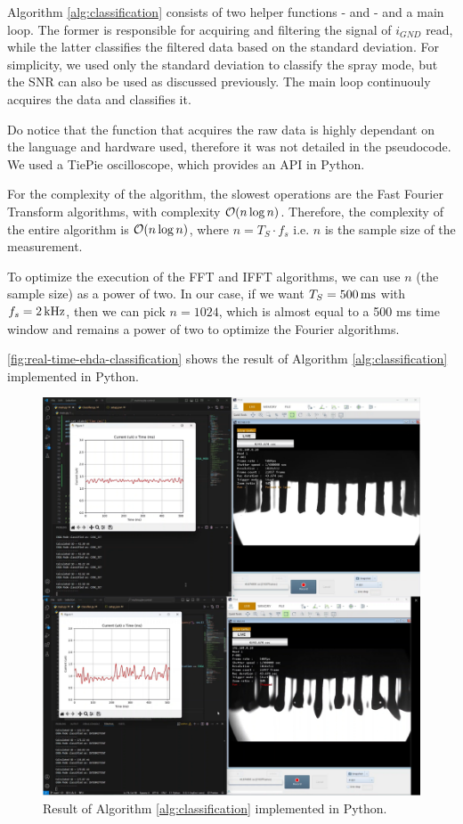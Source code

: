 \documentclass[oneside,12pt]{article}
\begin{document}
Algorithm \ref{alg:classification} consists of two helper functions - 
and  - and a main loop. 
The former is responsible for acquiring and filtering the signal of $i_{GND}$ read,
while the latter classifies the filtered data based on the standard deviation.
For simplicity, we used only the standard deviation to classify the spray mode, 
but the SNR can also be used as discussed previously. 
The main loop continuouly acquires the data and classifies it.

Do notice that the function that acquires the raw data is highly dependant on the language and hardware 
used, therefore it was not detailed in the pseudocode. We used a TiePie oscilloscope, which
provides an API in Python.

For the complexity of the algorithm, the slowest operations are the Fast Fourier
Transform algorithms, with complexity $\mathcal{O} (n\log{}n)$. Therefore, the complexity 
of the entire algorithm is $\mathcal{O} (n\log{}n)$, where $n = T_S \cdot f_s$ i.e. $n$ is the 
sample size of the measurement.

To optimize the execution of the FFT and IFFT algorithms, we can use $n$ (the sample size) as a power of two.
In our case, if we want $T_S = 500 \,\mathrm{ms}$ with $f_s = 2 \,\mathrm{kHz}$, then we can pick $n = 1024$, which is almost equal to a 
500 ms time window and remains a power of two to optimize the Fourier algorithms.

\autoref{fig:real-time-ehda-classification}
shows the result of Algorithm \ref{alg:classification} implemented in Python.

\begin{figure}[h!]
    \centering
    \includegraphics[width=\textwidth,trim=1 1 1 1,clip]{figures/real-time-ehda-classification.png}
    \caption{Result of Algorithm \ref{alg:classification} implemented in Python.}
    \label{fig:real-time-ehda-classification}
\end{figure}
\end{document}
